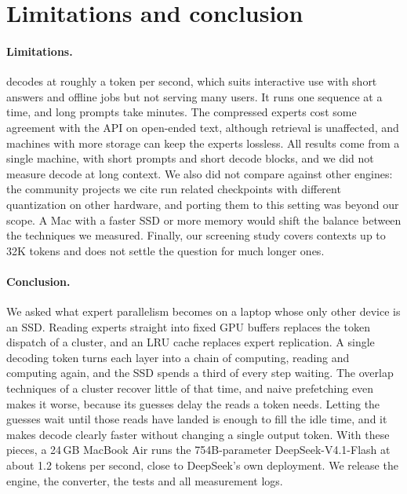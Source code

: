 \section{Limitations and conclusion}
\label{sec:conclusion}
\paragraph{Limitations.} \method{} decodes at roughly a token per second, which suits interactive use with short answers and offline jobs but not serving many users. It runs one sequence at a time, and long prompts take minutes. The compressed experts cost some agreement with the API on open-ended text, although retrieval is unaffected, and machines with more storage can keep the experts lossless. All results come from a single machine, with short prompts and short decode blocks, and we did not measure decode at long context. We also did not compare against other engines: the community projects we cite run related checkpoints with different quantization on other hardware, and porting them to this setting was beyond our scope. A Mac with a faster SSD or more memory would shift the balance between the techniques we measured. Finally, our screening study covers contexts up to 32K tokens and does not settle the question for much longer ones.

\paragraph{Conclusion.} We asked what expert parallelism becomes on a laptop whose only other device is an SSD. Reading experts straight into fixed GPU buffers replaces the token dispatch of a cluster, and an LRU cache replaces expert replication. A single decoding token turns each layer into a chain of computing, reading and computing again, and the SSD spends a third of every step waiting. The overlap techniques of a cluster recover little of that time, and naive prefetching even makes it worse, because its guesses delay the reads a token needs. Letting the guesses wait until those reads have landed is enough to fill the idle time, and it makes decode clearly faster without changing a single output token. With these pieces, a 24\,GB MacBook Air runs the 754B-parameter DeepSeek-V4.1-Flash at about 1.2 tokens per second, close to DeepSeek's own deployment. We release the engine, the converter, the tests and all measurement logs.
